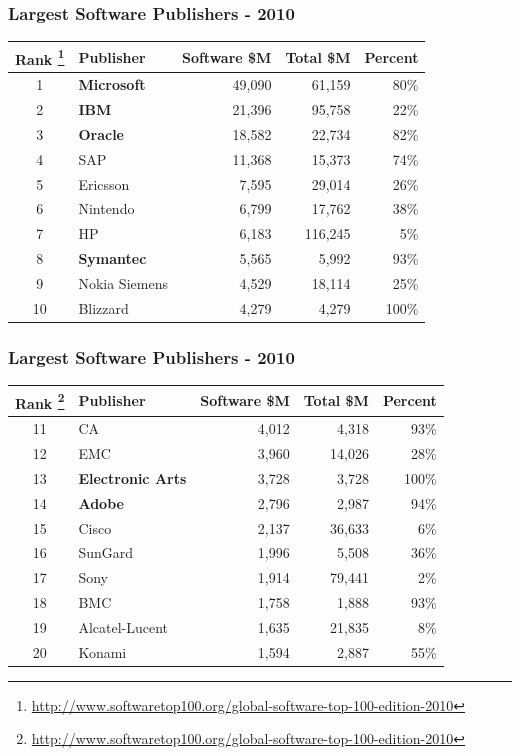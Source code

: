 \documentclass[18pt]{beamer}
\begin{document}
{
\begin{frame}
\frametitle{Largest Software Publishers - 2010}

\begin{center}
\begin{tabular}{clrrr}
\hline
  \textbf{Rank
\footnote{
\url{http://www.softwaretop100.org/global-software-top-100-edition-2010}}
} &\textbf{Publisher} & \textbf{Software \$M} & \textbf{Total \$M} & \textbf{Percent} \\
\hline
\hline
1 &  \textbf{Microsoft} & 49,090  & 61,159 &  80\% \\
2 &  \textbf{IBM} & 21,396  & 95,758  & 22\% \\
3 &  \textbf{Oracle} & 18,582  & 22,734 &  82\% \\
4 &  SAP & 11,368  & 15,373 &  74\% \\
5 &  Ericsson & 7,595  & 29,014 &  26\% \\
6 &  Nintendo & 6,799  &  17,762 &  38\% \\
7 &  HP & 6,183  &  116,245 &  5\% \\
8 &  \textbf{Symantec} & 5,565  & 5,992 &  93\% \\
9 &  Nokia Siemens & 4,529  &  18,114 &  25\% \\
10&  Blizzard & 4,279  & 4,279 & 100\% \\
\end{tabular}

\end{center}
\end{frame}
}


{
\begin{frame}
\frametitle{Largest Software Publishers - 2010}

\begin{center}
\begin{tabular}{clrrr}
\hline
\textbf{Rank
\footnote{
\url{http://www.softwaretop100.org/global-software-top-100-edition-2010}}
} &\textbf{Publisher} & \textbf{Software \$M} & \textbf{Total \$M} & \textbf{Percent} \\
\hline
\hline
11 & CA & 4,012  & 4,318 & 93\% \\
12 & EMC & 3,960  & 14,026 & 28\% \\
13 & \textbf{Electronic Arts} & 3,728  &  3,728 & 100\% \\
14 & \textbf{Adobe} & 2,796 &  2,987 & 94\% \\
15 & Cisco & 2,137 & 36,633 & 6\% \\
16 & SunGard & 1,996  & 5,508 & 36\% \\
17 & Sony & 1,914 &  79,441 & 2\% \\
18 & BMC & 1,758& 1,888 & 93\% \\
19 & Alcatel-Lucent & 1,635  &  21,835 & 8\% \\
20 & Konami & 1,594 &  2,887 & 55\% \\
\end{tabular}

\end{center}
\end{frame}
}
\end{document}
